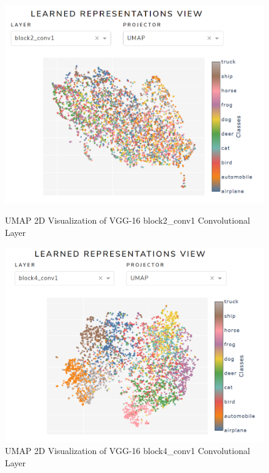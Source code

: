 \begin{figure}[H]
	\begin{minipage}{0.48\textwidth}
		\centering
		\includegraphics[width=1\linewidth]{images/embedding_view/HRV_Fig_015_DEV_Embedding_4.PNG}
		\caption{UMAP 2D Visualization of VGG-16 block2\_conv1 Convolutional Layer}\label{Fig:HRV_Fig_015_DEV_Embedding_4}
	\end{minipage}\hfill
	\begin{minipage}{0.48\textwidth}
		\centering
		\includegraphics[width=1\linewidth]{images/embedding_view/HRV_Fig_014_DEV_Embedding_3.PNG}
		\caption{UMAP 2D Visualization of VGG-16 block4\_conv1 Convolutional Layer}\label{Fig:HRV_Fig_014_DEV_Embedding_3}
	\end{minipage}
\end{figure}

